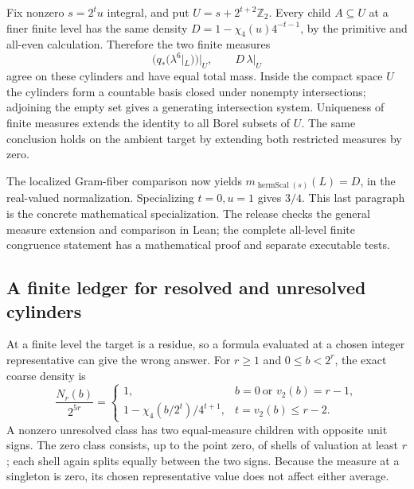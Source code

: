 \documentclass[12pt,letterpaper]{article}
\begin{document}
Fix nonzero \(s=2^t u\) integral, and put \(U=s+2^{t+2}\mathbb Z_2\). Every child \(A\subseteq U\) at a finer finite level has the same density \(D=1-\chi_4(u)4^{-t-1}\), by the primitive and all-even calculation. Therefore the two finite measures
\[
   (q_*(\lambda^6|_L))|_U,\qquad D\,\lambda|_U
\]
agree on these cylinders and have equal total mass. Inside the compact space \(U\) the cylinders form a countable basis closed under nonempty intersections; adjoining the empty set gives a generating intersection system. Uniqueness of finite measures extends the identity to all Borel subsets of \(U\). The same conclusion holds on the ambient target by extending both restricted measures by zero.

The localized Gram-fiber comparison now yields \(m_{\operatorname{hermScal}(s)}(L)=D\), in the real-valued normalization. Specializing \(t=0,u=1\) gives \(3/4\). This last paragraph is the concrete mathematical specialization. The release checks the general measure extension and comparison in Lean; the complete all-level finite congruence statement has a mathematical proof and separate executable tests.

\clearpage\subsection{A finite ledger for resolved and unresolved cylinders}
At a finite level the target is a residue, so a formula evaluated at a chosen integer representative can give the wrong answer. For \(r\ge1\) and \(0\le b<2^r\), the exact coarse density is
\[
 \frac{N_r(b)}{2^{5r}}=
 \begin{cases}
  1,& b=0\ \text{or } v_2(b)=r-1,\\
  1-\chi_4(b/2^t)/4^{t+1},& t=v_2(b)\le r-2.
 \end{cases}
\]
A nonzero unresolved class has two equal-measure children with opposite unit signs. The zero class consists, up to the point zero, of shells of valuation at least \(r\); each shell again splits equally between the two signs. Because the measure at a singleton is zero, its chosen representative value does not affect either average.
\end{document}
